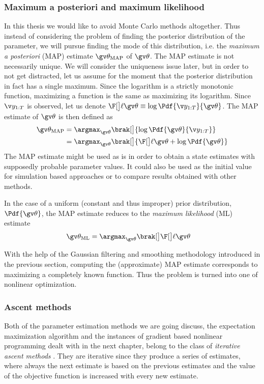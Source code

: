 \subsubsection{Maximum a posteriori and maximum likelihood}

In this thesis we would like to avoid Monte Carlo methods altogether. Thus instead
of considering the problem of finding the posterior distribution of the parameter,
we will pursue finding the mode of this distribution, i.e. the \emph{maximum a posteriori} (MAP) estimate
$\Th_{\text{MAP}}$ of $\Th$. The MAP estimate is not necessarily unique. 
We will consider the uniqueness issue later, but in order
to not get distracted, let us assume for the moment that the posterior distribution in fact
has a single maximum. Since the logarithm is a strictly monotonic function, maximizing a function
is the same as maximizing its logarithm. 
Since $\Y$ is observed, let us denote $\lLH \equiv \log \Pdf{\Y}{\Th}$.
The MAP estimate of $\Th$ is then defined as 
\begin{align}
	\Th_{\text{MAP}} &= \argmax_{\Th}\brak[\big]{ \log\Pdf{\Th}{\Y}} \nonumber\\ 
	&=\argmax_{\Th}\brak[\big]{\lLH + \log\Pdf{\Th}}
	\label{eq:MAP}
\end{align}
The MAP estimate might be used as is in order to obtain a state estimates
with supposedly probable parameter values. It could also be used as the initial
value for simulation based approaches or to compare results obtained with other
methods.

In the case of a uniform (constant and thus improper)
prior distribution, $\Pdf{\Th}$, the MAP estimate reduces to the
\emph{maximum likelihood} (ML) estimate
\begin{align}
	\Th_{\text{ML}} &= \argmax_{\Th}\brak[\big]\lLH
	\label{eq:ML}
\end{align}

With the help of the Gaussian filtering and smoothing methodology introduced in the
previous section, computing the (approximate) MAP estimate corresponds to maximizing a
completely known function. Thus the problem is turned into one of nonlinear optimization.

\subsubsection{Ascent methods}

Both of the parameter estimation methods we are going
discuss, the expectation maximization algorithm and
the instances of gradient based nonlinear programming dealt with in the
next chapter, belong to the class of \emph{iterative ascent methods} \parencite{luenberger2008}.
They are iterative since they produce a series of estimates, where
always the next estimate is based on the previous estimates and
the value of the objective function is increased with every new estimate.

